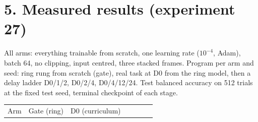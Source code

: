 \documentclass[

]{article}
\newcounter{none} %
\begin{document}
\section{5. Measured results (experiment 27)}\label{measured-results-experiment-27}



All arms: everything trainable from scratch, one learning rate (\(10^{-4}\), Adam), batch 64, no clipping, input centred, three stacked frames. Program per arm and seed: ring rung from scratch (gate), real task at D0 from the ring model, then a delay ladder D0/1/2, D0/2/4, D0/4/12/24. Test balanced accuracy on 512 trials at the fixed test seed, terminal checkpoint of each stage.



{\def\LTcaptype{none} %

\begin{longtable}[]{@{}

  >{\raggedright\arraybackslash}p{}

  >{\raggedright\arraybackslash}p{}

  >{\raggedright\arraybackslash}p{}

  >{\raggedright\arraybackslash}p{}

  >{\raggedright\arraybackslash}p{}

  >{\raggedright\arraybackslash}p{}

  >{\raggedright\arraybackslash}p{}@{}}

\toprule\noalign{}

\begin{minipage}[b]{\linewidth}\raggedright

Arm

\end{minipage} & \begin{minipage}[b]{\linewidth}\raggedright

Gate (ring)

\end{minipage} & \begin{minipage}[b]{\linewidth}\raggedright

D0 (curriculum)

\end{minipage} & \begin{minipage}[b]{\linewidth}\raggedright


\end{minipage}
\end{longtable}}
\end{document}

